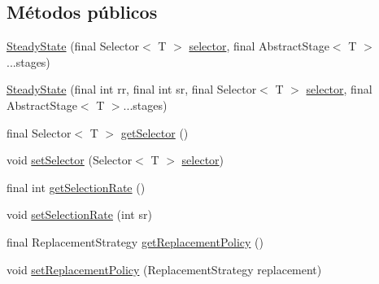 \subsection*{Métodos públicos}
\begin{DoxyCompactItemize}
\item 
\hyperlink{classjenes_1_1stage_1_1operator_1_1common_1_1_steady_state_3_01_t_01extends_01_chromosome_01_4_af39cd5e467ed1a020779c89894c5f63e}{Steady\-State} (final Selector$<$ T $>$ \hyperlink{classjenes_1_1stage_1_1operator_1_1common_1_1_steady_state_3_01_t_01extends_01_chromosome_01_4_a83a734a69acdc4ee13d42982a43e8ba1}{selector}, final Abstract\-Stage$<$ T $>$...stages)
\item 
\hyperlink{classjenes_1_1stage_1_1operator_1_1common_1_1_steady_state_3_01_t_01extends_01_chromosome_01_4_a3411aeb67d5f0914fdb6682627a507c9}{Steady\-State} (final int rr, final int sr, final Selector$<$ T $>$ \hyperlink{classjenes_1_1stage_1_1operator_1_1common_1_1_steady_state_3_01_t_01extends_01_chromosome_01_4_a83a734a69acdc4ee13d42982a43e8ba1}{selector}, final Abstract\-Stage$<$ T $>$...stages)
\item 
final Selector$<$ T $>$ \hyperlink{classjenes_1_1stage_1_1operator_1_1common_1_1_steady_state_3_01_t_01extends_01_chromosome_01_4_ac9493ab808eed1e19961d6ba1b97b52d}{get\-Selector} ()
\item 
void \hyperlink{classjenes_1_1stage_1_1operator_1_1common_1_1_steady_state_3_01_t_01extends_01_chromosome_01_4_ad4c63d6921648fac68ea074d8fb49002}{set\-Selector} (Selector$<$ T $>$ \hyperlink{classjenes_1_1stage_1_1operator_1_1common_1_1_steady_state_3_01_t_01extends_01_chromosome_01_4_a83a734a69acdc4ee13d42982a43e8ba1}{selector})
\item 
final int \hyperlink{classjenes_1_1stage_1_1operator_1_1common_1_1_steady_state_3_01_t_01extends_01_chromosome_01_4_a667fecf88fd68c6a89de0ee327eb9dcf}{get\-Selection\-Rate} ()
\item 
void \hyperlink{classjenes_1_1stage_1_1operator_1_1common_1_1_steady_state_3_01_t_01extends_01_chromosome_01_4_ad3182abb1581d4136efe349b46c4dba9}{set\-Selection\-Rate} (int sr)
\item 
final Replacement\-Strategy \hyperlink{classjenes_1_1stage_1_1operator_1_1common_1_1_steady_state_3_01_t_01extends_01_chromosome_01_4_ae8a1e24e3306c72bdf30094774b68915}{get\-Replacement\-Policy} ()
\item 
void \hyperlink{classjenes_1_1stage_1_1operator_1_1common_1_1_steady_state_3_01_t_01extends_01_chromosome_01_4_ab142c49cb09d7325f9bcc5d029acd36b}{set\-Replacement\-Policy} (Replacement\-Strategy replacement)

\end{DoxyCompactItemize}
